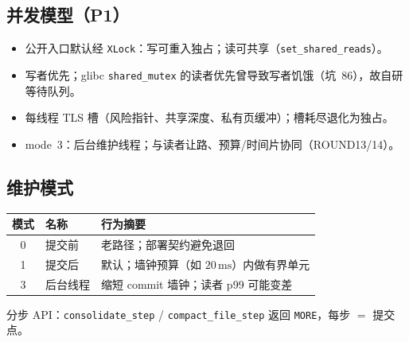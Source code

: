 \subsection{并发模型（P1）}
\begin{itemize}[leftmargin=1.6em]
  \item 公开入口默认经 \texttt{XLock}：写可重入独占；读可共享（\texttt{set\_shared\_reads}）。
  \item 写者优先；glibc \texttt{shared\_mutex} 的读者优先曾导致写者饥饿（坑~86），故自研等待队列。
  \item 每线程 TLS 槽（风险指针、共享深度、私有页缓冲）；槽耗尽退化为独占。
  \item mode~3：后台维护线程；与读者让路、预算/时间片协同（ROUND13/14）。
\end{itemize}

\subsection{维护模式}
\begin{center}
\begin{tabular}{@{}clp{8.5cm}@{}}
\toprule
模式 & 名称 & 行为摘要 \\
\midrule
0 & 提交前 & 老路径；部署契约避免退回 \\
1 & 提交后 & 默认；墙钟预算（如 $20\,\mathrm{ms}$）内做有界单元 \\
3 & 后台线程 & 缩短 commit 墙钟；读者 p99 可能变差 \\
\bottomrule
\end{tabular}
\end{center}
分步 API：\texttt{consolidate\_step} / \texttt{compact\_file\_step} 返回 \texttt{MORE}，每步 $=$ 提交点。
